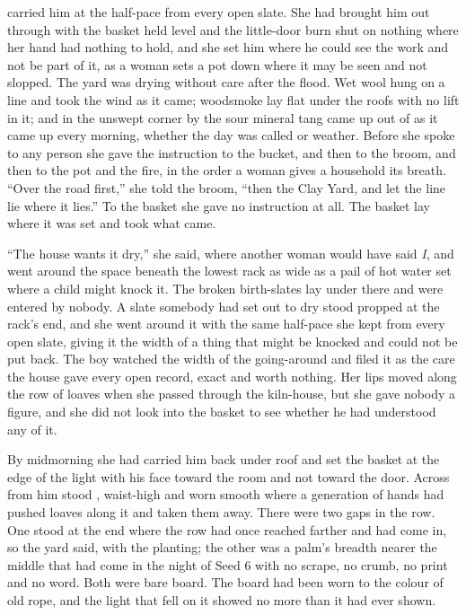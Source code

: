  carried him at the half-pace from every open slate. She had brought him out through  with the basket held level and the little-door burn shut on nothing where her hand had nothing to hold, and she set him where he could see the work and not be part of it, as a woman sets a pot down where it may be seen and not slopped. The yard was drying without care after the flood. Wet wool hung on a line and took the wind as it came; woodsmoke lay flat under the roofs with no lift in it; and in the unswept corner by  the sour mineral tang came up out of  as it came up every morning, whether the day was called  or weather. Before she spoke to any person she gave the instruction to the bucket, and then to the broom, and then to the pot and the fire, in the order a woman gives a household its breath. “Over the road first,” she told the broom, “then the Clay Yard, and let the line lie where it lies.” To the basket she gave no instruction at all. The basket lay where it was set and took what came.

“The house wants it dry,” she said, where another woman would have said \emph{I}, and went around the space beneath the lowest rack as wide as a pail of hot water set where a child might knock it. The broken birth-slates lay under there and were entered by nobody. A slate somebody had set out to dry stood propped at the rack's end, and she went around it with the same half-pace she kept from every open slate, giving it the width of a thing that might be knocked and could not be put back. The boy watched the width of the going-around and filed it as the care the house gave every open record, exact and worth nothing. Her lips moved along the row of loaves when she passed through the kiln-house, but she gave nobody a figure, and she did not look into the basket to see whether he had understood any of it.

By midmorning she had carried him back under  roof and set the basket at the edge of the light with his face toward the room and not toward the door. Across from him stood , waist-high and worn smooth where a generation of hands had pushed loaves along it and taken them away. There were two gaps in the row. One stood at the end where the row had once reached farther and had come in, so the yard said, with the planting; the other was a palm's breadth nearer the middle that had come in the night of Seed 6 with no scrape, no crumb, no print and no word. Both were bare board. The board had been worn to the colour of old rope, and the light that fell on it showed no more than it had ever shown.


